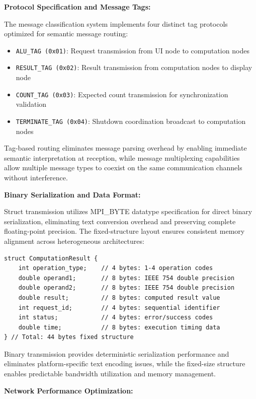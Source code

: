 \documentclass{article}
\begin{document}
\textbf{Protocol Specification and Message Tags:}

The message classification system implements four distinct tag protocols optimized for semantic message routing:

\begin{itemize}
\item \texttt{ALU\_TAG (0x01)}: Request transmission from UI node to computation nodes
\item \texttt{RESULT\_TAG (0x02)}: Result transmission from computation nodes to display node  
\item \texttt{COUNT\_TAG (0x03)}: Expected count transmission for synchronization validation
\item \texttt{TERMINATE\_TAG (0x04)}: Shutdown coordination broadcast to computation nodes
\end{itemize}

Tag-based routing eliminates message parsing overhead by enabling immediate semantic interpretation at reception, while message multiplexing capabilities allow multiple message types to coexist on the same communication channels without interference.

\textbf{Binary Serialization and Data Format:}

Struct transmission utilizes MPI\_BYTE datatype specification for direct binary serialization, eliminating text conversion overhead and preserving complete floating-point precision. The fixed-structure layout ensures consistent memory alignment across heterogeneous architectures:

\begin{verbatim}
struct ComputationResult {
    int operation_type;    // 4 bytes: 1-4 operation codes
    double operand1;       // 8 bytes: IEEE 754 double precision
    double operand2;       // 8 bytes: IEEE 754 double precision  
    double result;         // 8 bytes: computed result value
    int request_id;        // 4 bytes: sequential identifier
    int status;            // 4 bytes: error/success codes
    double time;           // 8 bytes: execution timing data
} // Total: 44 bytes fixed structure
\end{verbatim}

Binary transmission provides deterministic serialization performance and eliminates platform-specific text encoding issues, while the fixed-size structure enables predictable bandwidth utilization and memory management.

\textbf{Network Performance Optimization:}
\end{document}
